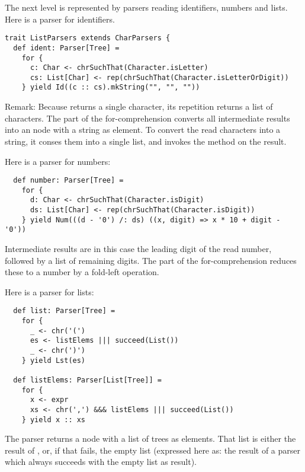 {{The next level is represented by parsers reading identifiers, numbers
and lists. Here is a parser for identifiers.
\begin{lstlisting}
trait ListParsers extends CharParsers {
  def ident: Parser[Tree] = 
    for {
      c: Char <- chrSuchThat(Character.isLetter)
      cs: List[Char] <- rep(chrSuchThat(Character.isLetterOrDigit))
    } yield Id((c :: cs).mkString("", "", ""))
\end{lstlisting}
Remark: Because  returns a single character, its
repetition  returns a list of characters. The
 part of the for-comprehension converts all intermediate
results into an  node with a string as element.  To convert
the read characters into a string, it conses them into a single list,
and invokes the  method on the result.

Here is a parser for numbers:
\begin{lstlisting}
  def number: Parser[Tree] =
    for {
      d: Char <- chrSuchThat(Character.isDigit)
      ds: List[Char] <- rep(chrSuchThat(Character.isDigit))
    } yield Num(((d - '0') /: ds) ((x, digit) => x * 10 + digit - '0'))
\end{lstlisting}
Intermediate results are in this case the leading digit of
the read number, followed by a list of remaining digits.  The
 part of the for-comprehension reduces these to a number
by a fold-left operation.

Here is a parser for lists:
\begin{lstlisting}
  def list: Parser[Tree] = 
    for {
      _ <- chr('(')
      es <- listElems ||| succeed(List())
      _ <- chr(')')
    } yield Lst(es)

  def listElems: Parser[List[Tree]] = 
    for {
      x <- expr
      xs <- chr(',') &&& listElems ||| succeed(List())
    } yield x :: xs
\end{lstlisting}
The  parser returns a  node with a list of trees
as elements.  That list is either the result of , or,
if that fails, the empty list (expressed here as: the result of a
parser which always succeeds with the empty list as result).

}}
